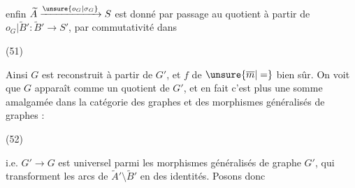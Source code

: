 enfin $\widetilde A\xrightarrow{\unsure{o_G|\sigma_G}}S$ est donné par passage au quotient à partir de $o_G|\widetilde B':\widetilde B'\to S'$, par commutativité dans

(51)\quad{}

Ainsi $G$ est reconstruit à partir de $G'$, et $f$ de $\unsure{\overline m|=}$ bien sûr. On voit que $G$ apparaît comme un quotient de $G'$, et en fait c'est plus une somme amalgamée dans la catégorie des graphes et des morphismes généralisés de graphes :

(52)\quad{}

i.e. $G'\longrightarrow G$ est universel parmi les morphismes généralisés de  graphe $G'$, qui transforment les arcs de $\widetilde A'\setminus\widetilde B'$ en des identités. Posons donc
